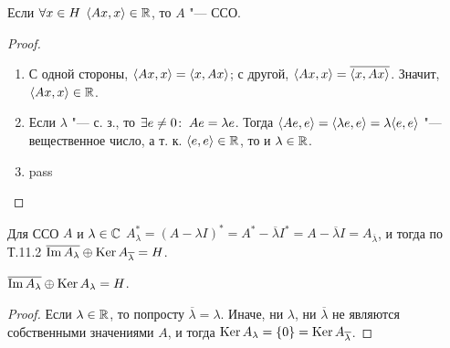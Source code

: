 \documentclass[main]{subfiles}
\begin{document}
\begin{exercise}
  Если \( \forall {x \in H} \; \, \langle Ax, x \rangle \in \mathbb{R} \),
  то \( A \) "--- ССО.
\end{exercise}

\begin{proof}~\begin{enumerate}
  \item С одной стороны, \( \langle Ax, x \rangle = \langle x, Ax \rangle \);
    с другой, \( \langle Ax, x \rangle = \overline{\langle x, Ax \rangle} \).
    Значит, \( \langle Ax, x \rangle \in \mathbb{R} \).
  \item Если \( \lambda \) "--- с. з., то
    \( \exists e \ne 0 \colon \: Ae = \lambda e \).
    Тогда \( \langle Ae, e \rangle = \langle \lambda e, e \rangle =
    \lambda \langle e, e \rangle \) "---
    вещественное число, а т. к. \( \langle e, e \rangle \in \mathbb{R} \),
    то и \( \lambda \in \mathbb{R} \).
  \item pass
\end{enumerate}\end{proof}

Для ССО \( A \) и \( \lambda \in \mathbb{C} \)
\( A_\lambda^* = (A - \lambda I)^* = A^* - \overline{\lambda} I^* =
A - \overline{\lambda} I = A_{\overline{\lambda}} \),
и тогда по Т.11.2
\( \overline{\operatorname{Im} A_\lambda} \oplus
\operatorname{Ker} A_{\overline{\lambda}} = H \).

\begin{theorem}
  \( \overline{\operatorname{Im} A_\lambda} \oplus
  \operatorname{Ker} A_{\lambda} = H \).
\end{theorem}
\begin{proof}
  Если \( \lambda \in \mathbb{R} \), то попросту
  \( \overline{\lambda} = \lambda \).
  Иначе, ни \( \lambda \),
  ни \( \overline{\lambda} \) не являются собственными
  значениями \( A \), и тогда
  \( \operatorname{Ker} A_\lambda = \{ 0 \} = \operatorname{Ker} A_{\overline\lambda} \).
\end{proof}
\end{document}
